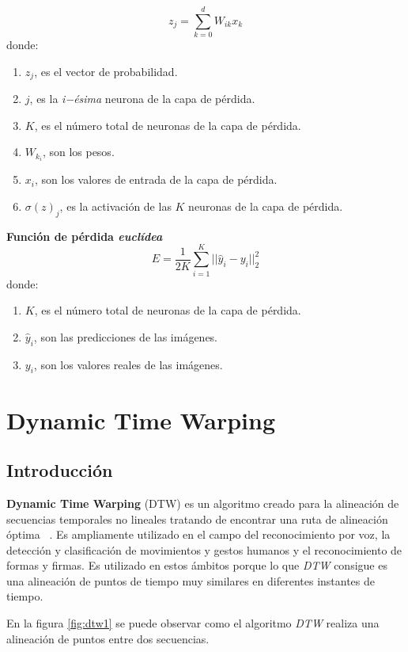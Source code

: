 \begin{equation}
z_j=\sum_{k=0}^{d}W_{ik}x_k
\end{equation}
donde:
\begin{enumerate}
    \item $z_j$, es el vector de probabilidad.
    \item $j$, es la \textit{i−ésima} neurona de la capa de pérdida.
    \item $K$, es el número total de neuronas de la capa de pérdida.
    \item $W_k_i$, son los pesos.
    \item $x_i$, son los valores de entrada de la capa de pérdida.
    \item $σ(z)_j$, es la activación de las $K$ neuronas de la capa de pérdida.
\end{enumerate}

\textbf{Función de pérdida \textit{euclídea}}
\begin{equation}
E=\frac{1}{2K}\sum_{i=1}^{K}||\hat{y}_i-y_i||^{2}_2
\end{equation}
donde:
\begin{enumerate}
    \item $K$, es el número total de neuronas de la capa de pérdida.
    \item $\hat{y}_i$, son las predicciones de las imágenes.
    \item $y_i$, son los valores reales de las imágenes.
\end{enumerate}


\section{Dynamic Time Warping} \label{cap:DTW}
\subsection{Introducción}
\textbf{Dynamic Time Warping} (DTW) es un algoritmo creado para la alineación de secuencias temporales no lineales tratando de encontrar una ruta de alineación óptima ~\cite{muller2007dynamic}. Es ampliamente utilizado en el campo del reconocimiento por voz, la detección y clasificación de movimientos y gestos humanos y el reconocimiento de formas y firmas. Es utilizado en estos ámbitos porque lo que \emph{DTW} consigue es una alineación de puntos de tiempo muy similares en diferentes instantes de tiempo.

En la figura \ref{fig:dtw1} se puede observar como el algoritmo \emph{DTW} realiza una alineación de puntos entre dos secuencias.


